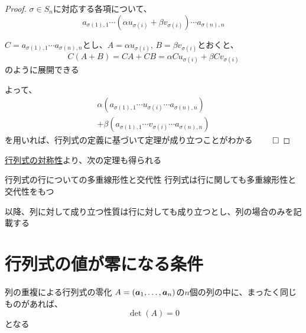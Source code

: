 \documentclass[../../../topic_linear-algebra]{subfiles}
\begin{document}
\begin{proof}
  $\sigma \in S_n$に対応する各項について、
  \begin{equation*}
    a_{\sigma(1),1} \cdots (\alpha u_{\sigma(i)} + \beta v_{\sigma(i)}) \cdots a_{\sigma(n),n}
  \end{equation*}

  $C = a_{\sigma(1),1} \cdots a_{\sigma(n),n}$とし、$A = \alpha u_{\sigma(i)}, \, B = \beta v_{\sigma(i)}$とおくと、
  \begin{equation*}
    C(A + B) = CA + CB = \alpha C u_{\sigma(i)} + \beta C v_{\sigma(i)}
  \end{equation*}
  のように展開できる

  よって、
  \begin{multline*}
    \alpha (a_{\sigma(1),1} \cdots u_{\sigma(i)} \cdots a_{\sigma(n),n}) \\
    + \beta(a_{\sigma(1),1} \cdots v_{\sigma(i)} \cdots a_{\sigma(n),n})
  \end{multline*}
  を用いれば、行列式の定義に基づいて定理が成り立つことがわかる $\qed$
\end{proof}

\sectionline

\hyperref[thm:determinant-transpose-invariance]{行列式の対称性}より、次の定理も得られる

\begin{theorem}{行列式の行についての多重線形性と交代性}
  行列式は行に関しても多重線形性と交代性をもつ
\end{theorem}

以降、列に対して成り立つ性質は行に対しても成り立つとし、列の場合のみを記載する

\sectionline
\section{行列式の値が零になる条件}

\begin{theorem}{列の重複による行列式の零化}\label{thm:det-zero-if-columns-repeat}
  $A = (\vb*{a}_1, \ldots, \vb*{a}_n)$の$n$個の列の中に、まったく同じものがあれば、
  \begin{equation*}
    \det(A) = 0
  \end{equation*}
  となる
\end{theorem}
\end{document}
